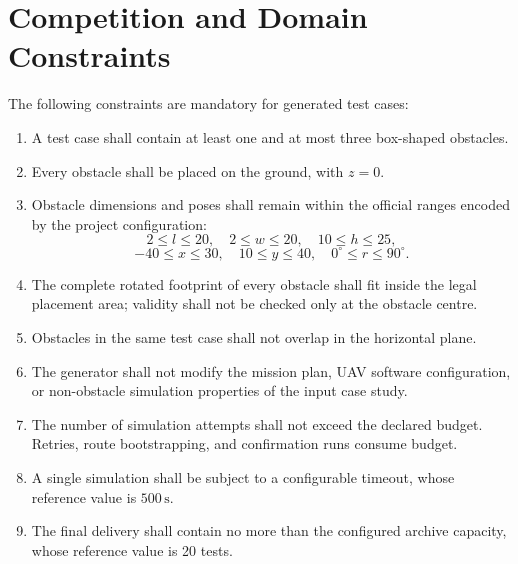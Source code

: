 \documentclass[11pt,a4paper]{report}
\begin{document}
\section{Competition and Domain Constraints}
\label{sec:constraints}
The following constraints are mandatory for generated test cases:
\begin{enumerate}[label=\textbf{C-\arabic*:}]
  \item A test case shall contain at least one and at most three box-shaped obstacles.
  \item Every obstacle shall be placed on the ground, with $z=0$.
  \item Obstacle dimensions and poses shall remain within the official ranges encoded by the project configuration:
  \[
  2 \le l \le 20,\quad 2 \le w \le 20,\quad 10 \le h \le 25,
  \]
  \[
  -40 \le x \le 30,\quad 10 \le y \le 40,\quad 0^\circ \le r \le 90^\circ.
  \]
  \item The complete rotated footprint of every obstacle shall fit inside the legal placement area; validity shall not be checked only at the obstacle centre.
  \item Obstacles in the same test case shall not overlap in the horizontal plane.
  \item The generator shall not modify the mission plan, UAV software configuration, or non-obstacle simulation properties of the input case study.
  \item The number of simulation attempts shall not exceed the declared budget. Retries, route bootstrapping, and confirmation runs consume budget.
  \item A single simulation shall be subject to a configurable timeout, whose reference value is $500\,\mathrm{s}$.
  \item The final delivery shall contain no more than the configured archive capacity, whose reference value is 20 tests.
\end{enumerate}
\end{document}
